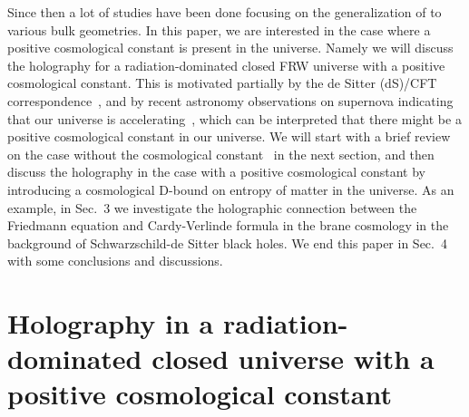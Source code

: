 \documentclass[a4paper,12pt]{article}
\begin{document}
Since then a lot of studies have been done focusing on the
generalization of \cite{Verl,SV} to various bulk geometries. In
this paper, we are interested in the case where a positive cosmological
constant is present in the universe. Namely we will discuss the holography 
for a radiation-dominated closed FRW universe with a positive
cosmological constant. This is motivated partially by the de 
Sitter (dS)/CFT correspondence~\cite{Strom}, and by recent astronomy 
observations on supernova indicating that our universe is accelerating~\cite{Super}, 
which can be 
interpreted that there might be a positive cosmological constant in our 
universe. We will start with a brief review on the case 
without the cosmological constant~\cite{Verl} in the next section, and then
discuss the holography in the case with a positive cosmological constant 
by introducing a cosmological D-bound on entropy of matter in the universe. 
As an example, in Sec.~3 we investigate the holographic connection between the 
Friedmann equation and Cardy-Verlinde formula in the brane cosmology in the
background of Schwarzschild-de Sitter black holes. We end this paper in 
Sec.~4 with some conclusions and discussions.  



\section{Holography in a radiation-dominated closed universe
with a positive cosmological constant}
\end{document}
